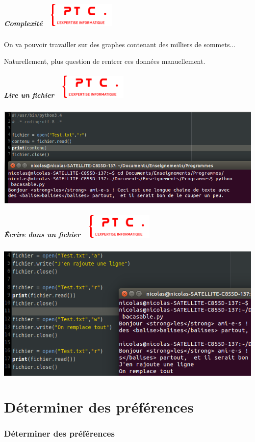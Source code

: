 \documentclass[11pt]{beamer}
\newenvironment{slide}[1]{%
\begin{frame}[environment=slide]
\frametitle{#1~\hfill~\includegraphics[height=1.2cm]{./epitech.png}}
}{%
\end{frame}
}
\begin{document}
\begin{slide}{Complexité}

On va pouvoir travailler sur des graphes contenant des milliers de sommets...\\

\vspace{0.3cm}

Naturellement, plus question de rentrer ces données manuellement.

\end{slide}

\begin{slide}{Lire un fichier}

\includegraphics[scale=0.4]{./pyopenfile}

\end{slide}

\begin{slide}{{\'E}crire dans un fichier}

\includegraphics[scale=0.4]{./pywritefile}

\end{slide}

\part{Déterminer des préférences}

\section{Déterminer des préférences}
\end{document}
